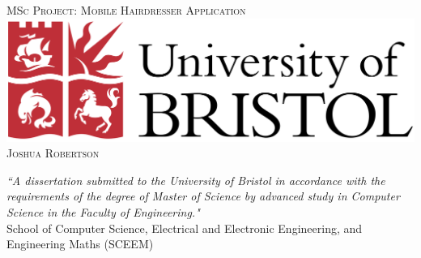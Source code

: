 \documentclass[12pt]{article}
\begin{document}
	
	\begin{titlepage}
		
		\newcommand{\HRule}{\rule{\linewidth}{0.5mm}} 
		
		\center %
		
		\textsc{\Large MSc Project: Mobile Hairdresser Application}\\[5 cm] 
		
		
		
		\includegraphics[scale=0.05]{images/logo.png}\\[1 cm]
		
		
		
		
		
		\textsc{\LARGE Joshua Robertson} \\[6 cm]
		
		
		
		
		
		
		
		
		
		
		\begin{center}
			
			\emph{“A dissertation submitted to the University of Bristol in accordance with the requirements of the degree of Master of Science by advanced study in Computer Science in the Faculty of Engineering."} \\[1.2 cm]
			
			
			School of Computer Science, Electrical and Electronic Engineering, and Engineering Maths (SCEEM) \\[1 cm]
			
			
			
		\end{center}
		
		
		
		
		\vfill %
		
	\end{titlepage}
\end{document}
